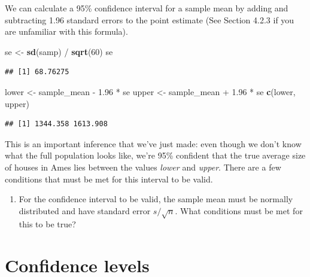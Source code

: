 \documentclass[]{book}
\newenvironment{Shaded}{\begin{snugshade}}{\end{snugshade}}
\newcommand{\KeywordTok}[1]{\textcolor[rgb]{0.13,0.29,0.53}{\textbf{{#1}}}}
\newcommand{\DecValTok}[1]{\textcolor[rgb]{0.00,0.00,0.81}{{#1}}}
\newcommand{\FloatTok}[1]{\textcolor[rgb]{0.00,0.00,0.81}{{#1}}}
\newcommand{\StringTok}[1]{\textcolor[rgb]{0.31,0.60,0.02}{{#1}}}
\newcommand{\NormalTok}[1]{{#1}}
\providecommand{\tightlist}{%
  \setlength{\itemsep}{0pt}\setlength{\parskip}{0pt}}
\theoremstyle{definition}
\theoremstyle{definition}
\theoremstyle{remark}
\begin{document}
We can calculate a 95\% confidence interval for a sample mean by adding
and subtracting 1.96 standard errors to the point estimate (See Section
4.2.3 if you are unfamiliar with this formula).

\begin{Shaded}
\begin{Highlighting}[]
\NormalTok{se <-}\StringTok{ }\KeywordTok{sd}\NormalTok{(samp) /}\StringTok{ }\KeywordTok{sqrt}\NormalTok{(}\DecValTok{60}\NormalTok{)}
\NormalTok{se}
\end{Highlighting}
\end{Shaded}

\begin{verbatim}
## [1] 68.76275
\end{verbatim}

\begin{Shaded}
\begin{Highlighting}[]
\NormalTok{lower <-}\StringTok{ }\NormalTok{sample_mean -}\StringTok{ }\FloatTok{1.96} \NormalTok{*}\StringTok{ }\NormalTok{se}
\NormalTok{upper <-}\StringTok{ }\NormalTok{sample_mean +}\StringTok{ }\FloatTok{1.96} \NormalTok{*}\StringTok{ }\NormalTok{se}
\KeywordTok{c}\NormalTok{(lower, upper)}
\end{Highlighting}
\end{Shaded}

\begin{verbatim}
## [1] 1344.358 1613.908
\end{verbatim}

This is an important inference that we've just made: even though we
don't know what the full population looks like, we're 95\% confident
that the true average size of houses in Ames lies between the values
\emph{lower} and \emph{upper}. There are a few conditions that must be
met for this interval to be valid.

\begin{enumerate}
\def\labelenumi{\arabic{enumi}.}
\setcounter{enumi}{2}
\tightlist
\item
  For the confidence interval to be valid, the sample mean must be
  normally distributed and have standard error \(s / \sqrt{n}\). What
  conditions must be met for this to be true?
\end{enumerate}

\section*{Confidence levels}\label{confidence-levels}
\end{document}
